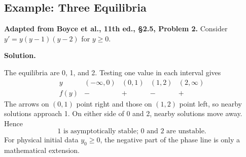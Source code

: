 \documentclass[11pt]{article}
\newenvironment{solution}
    {\par\noindent\textbf{Solution.}\par}
    {\par}
\begin{document}
\subsection{Example: Three Equilibria}
\textbf{Adapted from Boyce et al., 11th ed., \S2.5, Problem 2.}
Consider \(y'=y(y-1)(y-2)\) for \(y\geq0\).
\begin{solution}
The equilibria are 0, 1, and 2. Testing one value in each interval
gives
\[
\begin{array}{c|cccc}
y&(-\infty,0)&(0,1)&(1,2)&(2,\infty)\\\hline
f(y)&-&+&-&+
\end{array}
\]
The arrows on \((0,1)\) point right and those on \((1,2)\) point
left, so nearby solutions approach 1. On either side of 0 and 2,
nearby solutions move away. Hence
\[
\boxed{1\text{ is asymptotically stable; }0\text{ and }2
\text{ are unstable}.}
\]
For physical initial data \(y_0\geq0\), the negative part of the
phase line is only a mathematical extension.
\end{solution}
\end{document}
